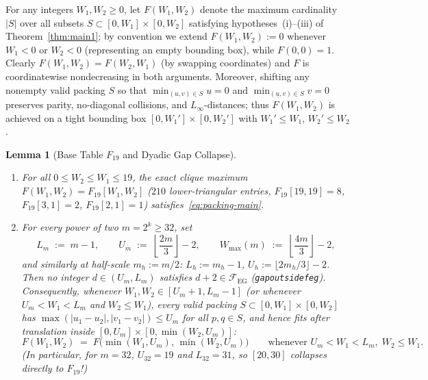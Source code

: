 \documentclass[11pt,reqno]{amsart}
\theoremstyle{plain}
\newtheorem{lemma}[theorem]{Lemma}
\theoremstyle{definition}
\theoremstyle{remark}
\newcommand{\FEG}{\mathcal{F}_{\mathrm{EG}}}
\DeclareRobustCommand{\_}{\ifmmode\text{\textunderscore}\else\textunderscore\allowbreak\fi}
\begin{document}
For any integers $W_1, W_2 \ge 0$, let $F(W_1, W_2)$ denote the maximum cardinality $|S|$ over all subsets $S \subset [0, W_1] \times [0, W_2]$ satisfying hypotheses~(i)--(iii) of Theorem~\ref{thm:main1}; by convention we extend $F(W_1, W_2) := 0$ whenever $W_1 < 0$ or $W_2 < 0$ (representing an empty bounding box), while $F(0, 0) = 1$. Clearly $F(W_1, W_2) = F(W_2, W_1)$ (by swapping coordinates) and $F$ is coordinatewise nondecreasing in both arguments. Moreover, shifting any nonempty valid packing $S$ so that $\min_{(u,v) \in S} u = 0$ and $\min_{(u,v) \in S} v = 0$ preserves parity, no-diagonal collisions, and $L_\infty$-distances; thus $F(W_1, W_2)$ is achieved on a tight bounding box $[0, W_1'] \times [0, W_2']$ with $W_1' \le W_1$, $W_2' \le W_2$.

\begin{lemma}[Base Table $F_{19}$ and Dyadic Gap Collapse]\label{lem:gap-collapse}
\leavevmode
\begin{enumerate}[label=(\roman*),leftmargin=2.2em]
  \item For all $0 \le W_2 \le W_1 \le 19$, the exact clique maximum $F(W_1, W_2) = F_{19}[W_1, W_2]$ ($210$ lower-triangular entries, $F_{19}[19, 19] = 8$, $F_{19}[3, 1] = 2$, $F_{19}[2, 1] = 1$) satisfies~\eqref{eq:packing-main}.
  \item For every power of two $m = 2^k \ge 32$, set
  \[
    L_m \;:=\; m - 1, \qquad U_m \;:=\; \left\lfloor \frac{2m}{3} \right\rfloor - 2, \qquad W_{\max}(m) \;:=\; \left\lfloor \frac{4m}{3} \right\rfloor - 2,
  \]
  and similarly at half-scale $m_h := m/2$: $L_h := m_h - 1$, $U_h := \lfloor 2m_h / 3 \rfloor - 2$. Then no integer $d \in (U_m, L_m)$ satisfies $d + 2 \in \FEG$ (\texttt{gap\_outside\_feg}). Consequently, whenever $W_1, W_2 \in [U_m + 1, L_m - 1]$ (or whenever $U_m < W_1 < L_m$ and $W_2 \le W_1$), every valid packing $S \subset [0, W_1] \times [0, W_2]$ has $\max(|u_1 - u_2|, |v_1 - v_2|) \le U_m$ for all $p, q \in S$, and hence fits after translation inside $[0, U_m] \times [0, \min(W_2, U_m)]$:
  \begin{equation}\label{eq:gap-collapse}
    F(W_1, W_2) \;=\; F\bigl(\min(W_1, U_m),\, \min(W_2, U_m)\bigr) \qquad \text{whenever } U_m < W_1 < L_m,\; W_2 \le W_1.
  \end{equation}
  (In particular, for $m = 32$, $U_{32} = 19$ and $L_{32} = 31$, so $[20, 30]$ collapses directly to $F_{19}$!)
\end{enumerate}
\end{lemma}
\end{document}
